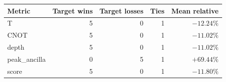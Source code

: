 \begin{tabular}{lrrrr}
\toprule
Metric & Target wins & Target losses & Ties & Mean relative \\
\midrule
T & 5 & 0 & 1 & $-12.24\%$ \\
CNOT & 5 & 0 & 1 & $-11.02\%$ \\
depth & 5 & 0 & 1 & $-11.02\%$ \\
peak_ancilla & 0 & 5 & 1 & $+69.44\%$ \\
score & 5 & 0 & 1 & $-11.80\%$ \\
\bottomrule
\end{tabular}

